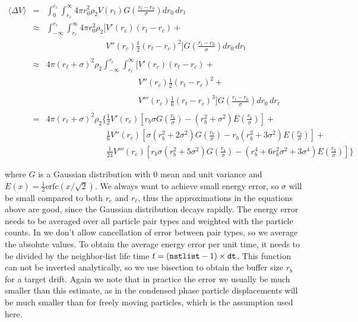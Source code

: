 {\begin{eqnarray}
\langle \Delta V \rangle \! &=&
\int_{0}^{r_c} \int_{r_\ell}^\infty 4 \pi r_0^2 \rho_2 V(r_t) G\!\left(\frac{r_t-r_0}{\sigma}\right) d r_0\, d r_t \\
&\approx&
\int_{-\infty}^{r_c} \int_{r_\ell}^\infty 4 \pi r_0^2 \rho_2 \Big[ V'(r_c) (r_t - r_c) +
\nonumber\\
& &
\phantom{\int_{-\infty}^{r_c} \int_{r_\ell}^\infty 4 \pi r_0^2 \rho_2 \Big[}
 V''(r_c)\frac{1}{2}(r_t - r_c)^2 \Big] G\!\left(\frac{r_t-r_0}{\sigma}\right) d r_0 \, d r_t\\
&\approx&
4 \pi (r_\ell+\sigma)^2 \rho_2
\int_{-\infty}^{r_c} \int_{r_\ell}^\infty \Big[ V'(r_c) (r_t - r_c) +
\nonumber\\
& &
\phantom{4 \pi (r_\ell+\sigma)^2 \rho_2 \int_{-\infty}^{r_c} \int_{r_\ell}^\infty \Big[}
V''(r_c)\frac{1}{2}(r_t - r_c)^2 +
\nonumber\\
& &
\phantom{4 \pi (r_\ell+\sigma)^2 \rho_2 \int_{-\infty}^{r_c} \int_{r_\ell}^\infty \Big[}
V'''(r_c)\frac{1}{6}(r_t - r_c)^3 \Big] G\!\left(\frac{r_t-r_0}{\sigma}\right)
d r_0 \, d r_t\\
&=&
4 \pi (r_\ell+\sigma)^2 \rho_2 \bigg\{
\frac{1}{2}V'(r_c)\left[r_b \sigma G\!\left(\frac{r_b}{\sigma}\right) - (r_b^2+\sigma^2)E\!\left(\frac{r_b}{\sigma}\right) \right] +
\nonumber\\
& &
\phantom{4 \pi (r_\ell+\sigma)^2 \rho_2 \bigg\{ }
\frac{1}{6}V''(r_c)\left[ \sigma(r_b^2+2\sigma^2)G\!\left(\frac{r_b}{\sigma}\right) - r_b(r_b^2+3\sigma^2 ) E\!\left(\frac{r_b}{\sigma}\right) \right] +
\nonumber\\
& &
\phantom{4 \pi (r_\ell+\sigma)^2 \rho_2 \bigg\{ }
\frac{1}{24}V'''(r_c)\left[ r_b\sigma(r_b^2+5\sigma^2)G\!\left(\frac{r_b}{\sigma}\right) - (r_b^4+6r_b^2\sigma^2+3\sigma^4 ) E\!\left(\frac{r_b}{\sigma}\right) \right]
\bigg\}
\end{eqnarray}

where $G$ is a Gaussian distribution with 0 mean and unit variance and
$E(x)=\frac{1}{2}\mathrm{erfc}(x/\sqrt{2})$. We always want to achieve
small energy error, so $\sigma$ will be small compared to both $r_c$
and $r_\ell$, thus the approximations in the equations above are good,
since the Gaussian distribution decays rapidly. The energy error needs
to be averaged over all particle pair types and weighted with the
particle counts. In {\gromacs} we don't allow cancellation of error
between pair types, so we average the absolute values. To obtain the
average energy error per unit time, it needs to be divided by the
neighbor-list life time $t = ({\tt nstlist} - 1)\times{\tt dt}$. This
function can not be inverted analytically, so we use bisection to
obtain the buffer size $r_b$ for a target drift.  Again we note that
in practice the error we usually be much smaller than this estimate,
as in the condensed phase particle displacements will be much smaller
than for freely moving particles, which is the assumption used here.

}
